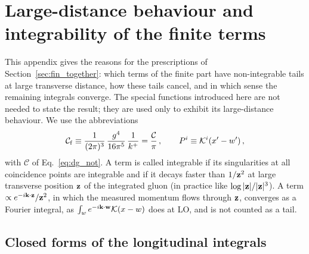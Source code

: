 \begingroup\sloppy
\section{Large-distance behaviour and integrability of the finite terms}\label{app:tails}

This appendix gives the reasons for the prescriptions of Section~\ref{sec:fin_together}: which terms of the finite part have non-integrable tails at large transverse distance, how these tails cancel, and in which sense the remaining integrals converge. The special functions introduced here are not needed to state the result; they are used only to exhibit its large-distance behaviour. We use the abbreviations
\begin{align}\label{eq:Cf}
\mathcal C_{\rm f}\equiv\frac{1}{(2\pi)^3}\,\frac{g^4}{16\pi^5}\,\frac{1}{k^+}=\frac{\mathcal C}{\pi}\,,\qquad P^i\equiv\mathcal{K}^i(x'-w')\,,
\end{align}
with $\mathcal C$ of Eq.~\eqref{eq:dg_not}. A term is called integrable if its singularities at all coincidence points are integrable and if it decays faster than $1/\mathbf{z}^2$ at large transverse position $\mathbf{z}$ of the integrated gluon (in practice like $\log|\mathbf{z}|/|\mathbf{z}|^3$). A term $\propto e^{-i\mathbf{k}\cdot\mathbf{z}}/\mathbf{z}^2$, in which the measured momentum flows through $\mathbf{z}$, converges as a Fourier integral, as $\int_we^{-i\mathbf{k}\cdot\mathbf{w}}\mathcal{K}(x-w)$ does at LO, and is not counted as a tail.

\subsection{Closed forms of the longitudinal integrals}\label{app:closedforms}

